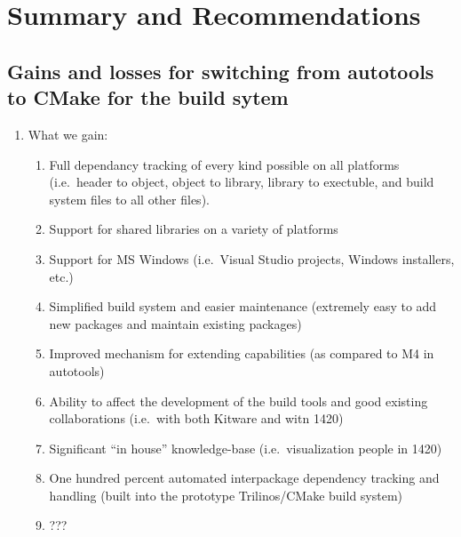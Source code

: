 \documentclass[pdf,ps2pdf,11pt]{SANDreport}
\begin{document}
%
\section{Summary and Recommendations}
%


%
\subsection{Gains and losses for switching from autotools to CMake for the build sytem}
%

\begin{enumerate}

{}\item What we gain:

  \begin{enumerate}

  {}\item Full dependancy tracking of every kind possible on all
  platforms (i.e.\ header to object, object to library, library to
  exectuble, and build system files to all other files).

  {}\item Support for shared libraries on a variety of platforms

  {}\item Support for MS Windows (i.e.\ Visual Studio projects,
  Windows installers, etc.)

  {}\item Simplified build system and easier maintenance (extremely
  easy to add new packages and maintain existing packages)

  {}\item Improved mechanism for extending capabilities (as compared
  to M4 in autotools)

  {}\item Ability to affect the development of the build tools and
  good existing collaborations (i.e.\ with both Kitware and witn 1420)

  {}\item Significant ``in house'' knowledge-base (i.e.\ visualization
  people in 1420)

  {}\item One hundred percent automated interpackage dependency
  tracking and handling (built into the prototype Trilinos/CMake build
  system)

  {}\item ???

  \end{enumerate}


\end{enumerate}
\end{document}
